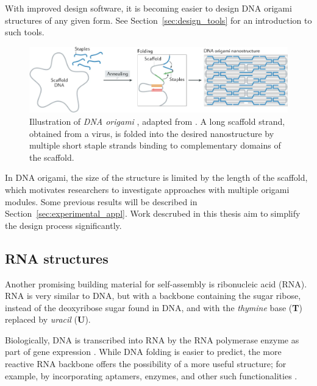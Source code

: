 With improved design software, it is becoming easier to design DNA origami structures of any given form. See Section~\ref{sec:design_tools} for an introduction to such tools.



\begin{figure}
    \centering
    \includegraphics[width=\textwidth]{figures/dna_origami.png}
    \caption{Illustration of \emph{DNA origami} \cite{rothemund2006folding}, adapted from \cite{dey2021dna}. A long scaffold strand, obtained from a virus, is folded into the desired nanostructure by multiple short staple strands binding to complementary domains of the scaffold.
    }
    \label{fig:dnaOrigami}
\end{figure}

In DNA origami, the size of the structure is limited by the length of the scaffold, which motivates researchers to investigate approaches with multiple origami modules. Some previous results will be described in Section~\ref{sec:experimental_appl}. Work descrubed in this thesis aim to simplify the design process significantly.

\subsection{RNA structures}
\label{sec:RNA_design}
Another promising building material for self-assembly is ribonucleic acid (RNA). RNA is very similar to DNA, but with a backbone containing the sugar ribose, instead of the deoxyribose sugar found in DNA, and with the \emph{thymine} base (\textbf{T}) replaced by \emph{uracil} (\textbf{U}).

Biologically, DNA is transcribed into RNA by the RNA polymerase enzyme as part of gene expression \cite{sadava2014life}. While DNA folding is easier to predict, the more reactive RNA backbone offers the possibility of a more useful structure; for example, by incorporating aptamers, enzymes, and other such functionalities \cite{guo2010emerging}.

